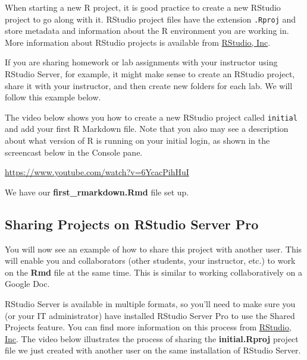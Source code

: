 \documentclass[]{tufte-book}
\begin{document}
When starting a new R project, it is good practice to create a new RStudio project to go along with it. RStudio project files have the extension \texttt{.Rproj} and store metadata and information about the R environment you are working in. More information about RStudio projects is available from \href{https://support.rstudio.com/hc/en-us/articles/200526207-Using-Projects}{RStudio, Inc}.

If you are sharing homework or lab assignments with your instructor using RStudio Server, for example, it might make sense to create an RStudio project, share it with your instructor, and then create new folders for each lab. We will follow this example below.

The video below shows you how to create a new RStudio project called \texttt{initial} and add your first R Markdown file. Note that you also may see a description about what version of R is running on your initial login, as shown in the screencast below in the Console pane.

\vspace{0.1in}\begin{center}\footnotesize{\url{https://www.youtube.com/watch?v=6YcacPihHuI}}\end{center}\vspace{0.1in}

We have our \textbf{first\_rmarkdown.Rmd} file set up.

\subsection{Sharing Projects on RStudio Server Pro}\label{sharing-projects-on-rstudio-server-pro}

You will now see an example of how to share this project with another user. This will enable you and collaborators (other students, your instructor, etc.) to work on the \textbf{Rmd} file at the same time. This is similar to working collaboratively on a Google Doc.

RStudio Server is available in multiple formats, so you'll need to make sure you (or your IT administrator) have installed RStudio Server Pro to use the Shared Projects feature. You can find more information on this process from \href{https://support.rstudio.com/hc/en-us/articles/211659737-Sharing-Projects-in-RStudio-Server-Pro}{RStudio, Inc}. The video below illustrates the process of sharing the \textbf{initial.Rproj} project file we just created with another user on the same installation of RStudio Server.
\end{document}
